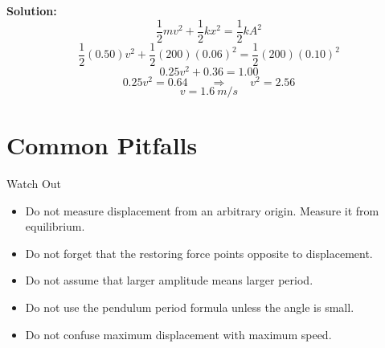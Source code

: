 \textbf{Solution:}
\begin{equation}
    \frac{1}{2}mv^2 + \frac{1}{2}kx^2 = \frac{1}{2}kA^2
\end{equation}
\begin{equation}
    \frac{1}{2}(0.50)v^2 + \frac{1}{2}(200)(0.06)^2 = \frac{1}{2}(200)(0.10)^2
\end{equation}
\begin{equation}
    0.25v^2 + 0.36 = 1.00
\end{equation}
\begin{equation}
    0.25v^2 = 0.64
    \qquad \Rightarrow \qquad
    v^2 = 2.56
\end{equation}
\begin{equation}
    v = \SI{1.6}{m/s}
\end{equation}

\section{Common Pitfalls}
\begin{pitfall}{Watch Out}
\begin{itemize}
    \item Do not measure displacement from an arbitrary origin. Measure it from equilibrium.
    \item Do not forget that the restoring force points opposite to displacement.
    \item Do not assume that larger amplitude means larger period.
    \item Do not use the pendulum period formula unless the angle is small.
    \item Do not confuse maximum displacement with maximum speed.
\end{itemize}
\end{pitfall}



